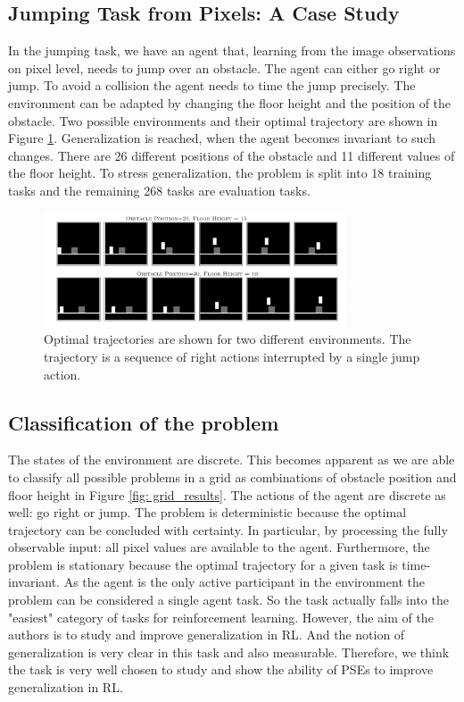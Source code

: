 \documentclass{usiinftr}
\begin{document}
\subsection{Jumping Task from Pixels: A Case Study}
In the jumping task, we have an agent that, learning from the image observations on pixel level, needs to jump over an obstacle. The agent can either go right or jump. To avoid a collision the agent needs to time the jump precisely. The environment can be adapted by changing the floor height and the position of the obstacle. Two possible environments and their optimal trajectory are shown in Figure \ref{fig: optimal_trajectories}. Generalization is reached, when the agent becomes invariant to such changes.
There are 26 different positions of the obstacle and 11 different values of the floor height. To stress generalization, the problem is split into 18 training tasks and the remaining 268 tasks are evaluation tasks.
\begin{figure}[h] 
\centering
\includegraphics[width = 0.8\textwidth]{figures/optimal_trajectories.png}
\caption{\label{fig: optimal_trajectories}Optimal trajectories are shown for two different environments. The trajectory is a sequence of right actions interrupted by a single jump action. \cite{agarwal2021contrastive} }
\end{figure}


\subsection{Classification of the problem}
The states of the environment are discrete. This becomes apparent as we are able to classify all possible problems in a grid as combinations of obstacle position and floor height in Figure \ref{fig: grid_results}.
The actions of the agent are discrete as well: go right or jump.
The problem is deterministic because the optimal trajectory can be concluded with certainty.
In particular, by processing the fully observable input: all pixel values are available to the agent.
Furthermore, the problem is stationary because the optimal trajectory for a given task is time-invariant.
As the agent is the only active participant in the environment the problem can be considered a single agent task.
So the task actually falls into the "easiest" category of tasks for reinforcement learning. However, the aim of the authors is to study and improve generalization in RL. And the notion of generalization is very clear in this task and also measurable. Therefore, we think the task is very well chosen to study and show the ability of PSEs to improve generalization in RL.
\end{document}
